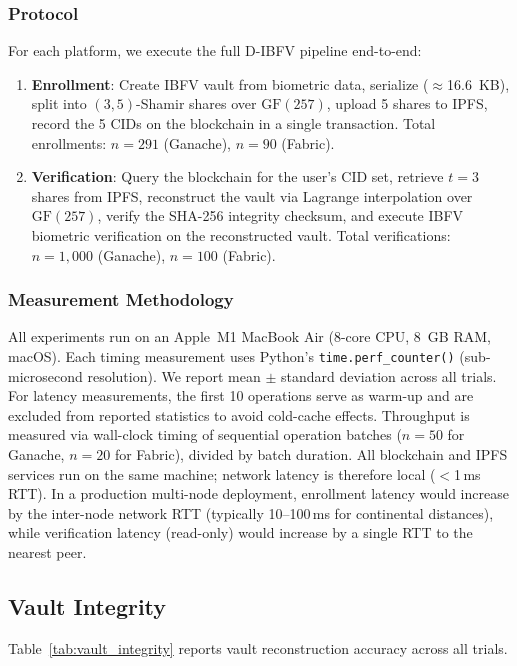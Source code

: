 \documentclass[3p,twocolumn]{elsarticle}
\newcommand{\IBFV}{\textsf{IBFV}}
\newcommand{\DIBFV}{\textsf{D-IBFV}}
\begin{document}
\subsubsection{Protocol}
For each platform, we execute the full \DIBFV{} pipeline end-to-end:
\begin{enumerate}
    \item \textbf{Enrollment}: Create \IBFV{} vault from biometric data, serialize ($\approx$16.6~KB), split into $(3,5)$-Shamir shares over $\mathrm{GF}(257)$, upload 5 shares to IPFS, record the 5 CIDs on the blockchain in a single transaction. Total enrollments: $n{=}291$ (Ganache), $n{=}90$ (Fabric).
    \item \textbf{Verification}: Query the blockchain for the user's CID set, retrieve $t{=}3$ shares from IPFS, reconstruct the vault via Lagrange interpolation over $\mathrm{GF}(257)$, verify the SHA-256 integrity checksum, and execute \IBFV{} biometric verification on the reconstructed vault. Total verifications: $n{=}1{,}000$ (Ganache), $n{=}100$ (Fabric).
\end{enumerate}

\subsubsection{Measurement Methodology}
All experiments run on an Apple~M1 MacBook Air (8-core CPU, 8~GB RAM, macOS). Each timing measurement uses Python's \texttt{time.perf\_counter()} (sub-microsecond resolution). We report mean $\pm$ standard deviation across all trials. For latency measurements, the first 10 operations serve as warm-up and are excluded from reported statistics to avoid cold-cache effects. Throughput is measured via wall-clock timing of sequential operation batches ($n{=}50$ for Ganache, $n{=}20$ for Fabric), divided by batch duration. All blockchain and IPFS services run on the same machine; network latency is therefore local ($<$1\,ms RTT). In a production multi-node deployment, enrollment latency would increase by the inter-node network RTT (typically 10--100\,ms for continental distances), while verification latency (read-only) would increase by a single RTT to the nearest peer.

\subsection{Vault Integrity}
\label{sec:vault_integrity}

Table~\ref{tab:vault_integrity} reports vault reconstruction accuracy across all trials.
\end{document}
